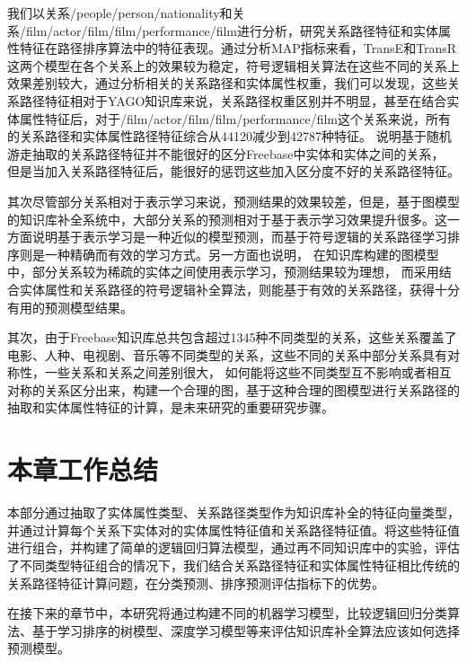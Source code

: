 我们以关系/people/person/nationality和关系/film/actor/film/film/performance/film进行分析，研究关系路径特征和实体属性特征在路径排序算法中的特征表现。通过分析MAP指标来看，TransE和TransR这两个模型在各个关系上的效果较为稳定，符号逻辑相关算法在这些不同的关系上效果差别较大，通过分析相关的关系路径和实体属性权重，我们可以发现，这些关系路径特征相对于YAGO知识库来说，关系路径权重区别并不明显，甚至在结合实体属性特征后，对于/film/actor/film/film/performance/film这个关系来说，所有的关系路径和实体属性路径特征综合从44120减少到42787种特征。
说明基于随机游走抽取的关系路径特征并不能很好的区分Freebase中实体和实体之间的关系，
但是当加入关系路径特征后，能很好的惩罚这些加入区分度不好的关系路径特征。

其次尽管部分关系相对于表示学习来说，预测结果的效果较差，但是，基于图模型的知识库补全系统中，大部分关系的预测相对于基于表示学习效果提升很多。这一方面说明基于表示学习是一种近似的模型预测，而基于符号逻辑的关系路径学习排序则是一种精确而有效的学习方式。另一方面也说明，
在知识库构建的图模型中，部分关系较为稀疏的实体之间使用表示学习，预测结果较为理想，
而采用结合实体属性和关系路径的符号逻辑补全算法，则能基于有效的关系路径，获得十分有用的预测模型结果。

其次，由于Freebase知识库总共包含超过1345种不同类型的关系，这些关系覆盖了电影、人种、电视剧、音乐等不同类型的关系，这些不同的关系中部分关系具有对称性，一些关系和关系之间差别很大，
如何能将这些不同类型互不影响或者相互对称的关系区分出来，构建一个合理的图，基于这种合理的图模型进行关系路径的抽取和实体属性特征的计算，是未来研究的重要研究步骤。

\section{本章工作总结}
本部分通过抽取了实体属性类型、关系路径类型作为知识库补全的特征向量类型，并通过计算每个关系下实体对的实体属性特征值和关系路径特征值。将这些特征值进行组合，并构建了简单的逻辑回归算法模型，通过再不同知识库中的实验，评估了不同类型特征组合的情况下，我们结合关系路径特征和实体属性特征相比传统的关系路径特征计算问题，在分类预测、排序预测评估指标下的优势。

在接下来的章节中，本研究将通过构建不同的机器学习模型，比较逻辑回归分类算法、基于学习排序的树模型、深度学习模型等来评估知识库补全算法应该如何选择预测模型。 